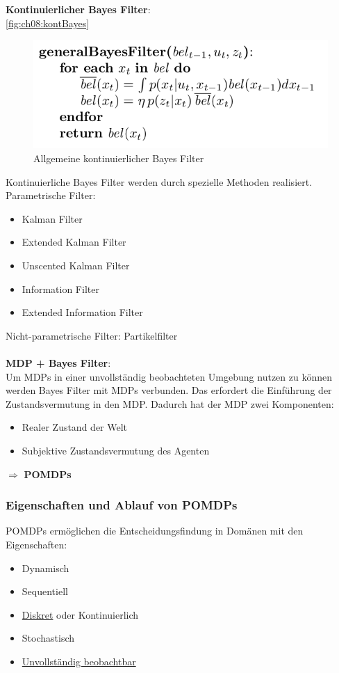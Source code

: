 \textbf{Kontinuierlicher Bayes Filter}:\\
\autoref{fig:ch08:kontBayes}
\begin{figure}[h!]
	\centering
  \includegraphics[width=0.5\linewidth]{figures/ch08_kontinuierlicherBayes.png}
\caption{Allgemeine kontinuierlicher Bayes Filter}
\label{fig:ch08:kontBayes}
\end{figure}
Kontinuierliche Bayes Filter werden durch spezielle Methoden realisiert.\\
Parametrische Filter:
\begin{itemize}
	\item Kalman Filter
	\item Extended Kalman Filter
	\item Unscented Kalman Filter
	\item Information Filter
	\item Extended Information Filter
\end{itemize}
Nicht-parametrische Filter: Partikelfilter\\ \\
\textbf{MDP + Bayes Filter}:\\
Um MDPs in einer unvollst\"andig beobachteten Umgebung nutzen zu k\"onnen werden Bayes Filter mit MDPs verbunden.
Das erfordert die Einf\"uhrung der Zustandsvermutung in den MDP.
Dadurch hat der MDP zwei Komponenten:
\begin{itemize}
	\item Realer Zustand der Welt
	\item Subjektive Zustandsvermutung des Agenten
\end{itemize}
$\Rightarrow$ \textbf{POMDPs}
\subsubsection{Eigenschaften und Ablauf von POMDPs}
POMDPs ermöglichen die Entscheidungsfindung in Domänen mit den Eigenschaften:
\begin{itemize}
	\item Dynamisch
	\item Sequentiell
	\item \underline{Diskret} oder Kontinuierlich
	\item Stochastisch
	\item \underline{Unvollst\"andig beobachtbar}
\end{itemize}

